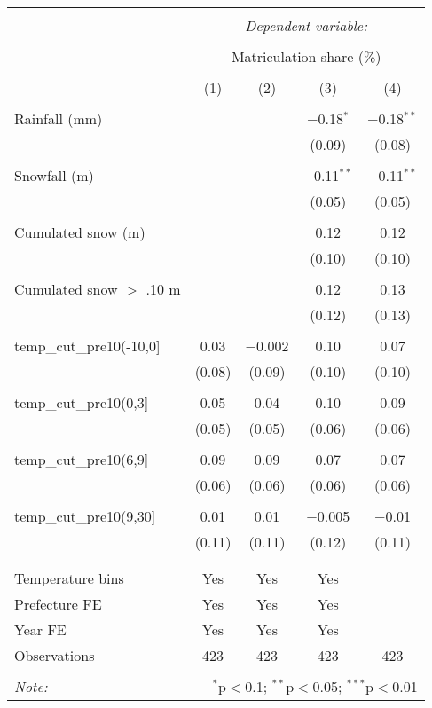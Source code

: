 
\begin{tabular}{@{\extracolsep{5pt}}lcccc} 
\\[-1.8ex]\hline 
\hline \\[-1.8ex] 
 & \multicolumn{4}{c}{\textit{Dependent variable:}} \\ 
\cline{2-5} 
\\[-1.8ex] & \multicolumn{4}{c}{Matriculation share (\%)} \\ 
\\[-1.8ex] & (1) & (2) & (3) & (4)\\ 
\hline \\[-1.8ex] 
 Rainfall (mm) &  &  & $-$0.18$^{*}$ & $-$0.18$^{**}$ \\ 
  &  &  & (0.09) & (0.08) \\ 
  & & & & \\ 
 Snowfall (m) &  &  & $-$0.11$^{**}$ & $-$0.11$^{**}$ \\ 
  &  &  & (0.05) & (0.05) \\ 
  & & & & \\ 
 Cumulated snow (m) &  &  & 0.12 & 0.12 \\ 
  &  &  & (0.10) & (0.10) \\ 
  & & & & \\ 
 Cumulated snow $>$ .10 m &  &  & 0.12 & 0.13 \\ 
  &  &  & (0.12) & (0.13) \\ 
  & & & & \\ 
 temp\_cut\_pre10(-10,0] & 0.03 & $-$0.002 & 0.10 & 0.07 \\ 
  & (0.08) & (0.09) & (0.10) & (0.10) \\ 
  & & & & \\ 
 temp\_cut\_pre10(0,3] & 0.05 & 0.04 & 0.10 & 0.09 \\ 
  & (0.05) & (0.05) & (0.06) & (0.06) \\ 
  & & & & \\ 
 temp\_cut\_pre10(6,9] & 0.09 & 0.09 & 0.07 & 0.07 \\ 
  & (0.06) & (0.06) & (0.06) & (0.06) \\ 
  & & & & \\ 
 temp\_cut\_pre10(9,30] & 0.01 & 0.01 & $-$0.005 & $-$0.01 \\ 
  & (0.11) & (0.11) & (0.12) & (0.11) \\ 
  & & & & \\ 
\hline \\[-1.8ex] 
Temperature bins & Yes & Yes & Yes &  \\ 
Prefecture FE & Yes & Yes & Yes &  \\ 
Year FE & Yes & Yes & Yes &  \\ 
Observations & 423 & 423 & 423 & 423 \\ 
\hline 
\hline \\[-1.8ex] 
\textit{Note:}  & \multicolumn{4}{r}{$^{*}$p$<$0.1; $^{**}$p$<$0.05; $^{***}$p$<$0.01} \\ 
\end{tabular} 
